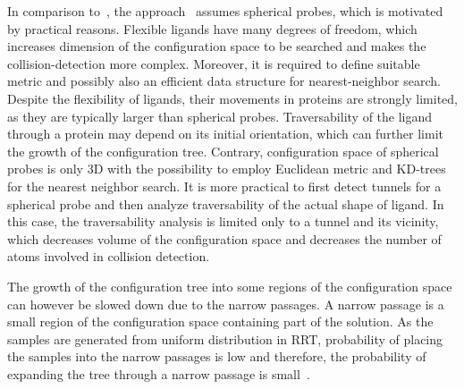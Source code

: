 \documentclass{llncs}
\begin{document}
In comparison to~\cite{guieysse2008structure}, the approach~\cite{vonasek2016application} assumes spherical probes, which is motivated
by practical reasons.
Flexible ligands have many degrees of freedom, which increases dimension of the configuration space to be searched and makes
the collision-detection more complex.
Moreover, it is required to define suitable metric and possibly also an efficient data structure for nearest-neighbor search.
Despite the flexibility of ligands, their movements in proteins are strongly limited, as they are typically larger than spherical
probes.
Traversability of the ligand through a protein may depend on its initial orientation, 
 which can further limit the growth of the configuration tree.
Contrary, configuration space of  spherical probes is only 3D with the possibility to employ Euclidean metric and KD-trees for the
nearest neighbor search.
It is more practical to first detect tunnels for a spherical probe and then analyze traversability of the actual shape of ligand.
In this case, the traversability analysis is limited only to a tunnel and its vicinity, which decreases volume of the configuration space and
decreases the number of atoms involved in collision detection.

The growth of the configuration tree into some regions of the configuration space can however be slowed down due to the narrow passages.
A narrow passage is a small region of the configuration space containing part of the solution.
As the samples are generated from uniform distribution in RRT, probability of placing the samples into the narrow passages is low and therefore,
   the probability of expanding the tree through a narrow passage is small~\cite{hannaWIS}.
\end{document}
